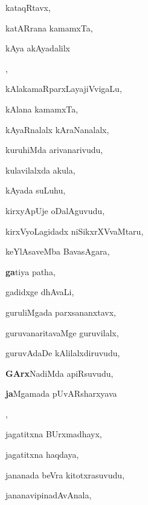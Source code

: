 \begin{multicols}{3}
{\noindent
{kataqRtavx}, \pageref{kataqRtavx}

\noindent
{katARrana kamamxTa}, \pageref{katARrana kamamxTa}

\noindent
{kAya akAyadalilx}

\noindent
{}, \pageref{kAya akAyadalilx aDaguvudu}

\noindent
{kAlakamaRparxLayajiVvigaLu}, \pageref{kAlakamaRparxLayajiVvigaLu}

\noindent
{kAlana kamamxTa}, \pageref{kAlana kamamxTa}

\noindent
{kAyaRnalalx kAraNanalalx}, \pageref{kAyaRnalalx kAraNanalalx}

\noindent
{kuruhiMda arivanarivudu}, \pageref{kuruhiMda arivanarivudu}

\noindent
{kulavilalxda akula}, \pageref{kulavilalxda akula}

\noindent
{kAyada suLuhu}, \pageref{kAyada suLuhu}

\noindent
{kirxyApUje oDalAguvudu}, \pageref{kirxyApUje oDalAguvudu}

\noindent
{kirxVyoLagidadx niSikxrXVvaMtaru}, \pageref{kirxVyoLagidadx niSikxrXVvaMtaru}

\noindent
{keYlAsaveMba BavasAgara}, \pageref{keYlAsaveMba BavasAgara}

\noindent
{{\large\textbf{ga}}tiya patha}, \pageref{gatiya patha}

\noindent
{gadidxge dhAvaLi}, \pageref{gadidxge dhAvaLi}

\noindent
{guruliMgada parxsananxtavx}, \pageref{guruliMgada parxsananxtavx}

\noindent
{guruvanaritavaMge guruvilalx}, \pageref{guruvanaritavaMge guruvilalx}

\noindent
{guruvAdaDe kAlilalxdiruvudu}, \pageref{guruvAdaDe kAlilalxdiruvudu}

\noindent
{{\large\textbf{GArx}}NadiMda apiRsuvudu}, \pageref{GArxNadiMda apiRsuvudu}

\noindent
{{\large\textbf{ja}}Mgamada pUvARsharxyava}

\noindent
{}, \pageref{jaMgamada pUvARsharxyava kaLeyuvudu}

\noindent
{jagatitxna BUrxmadhayx}, \pageref{jagatitxna BUrxmadhayx}

\noindent
{jagatitxna haqdaya}, \pageref{jagatitxna haqdaya}

\noindent
{jananada beVra kitotxrasuvudu}, \pageref{jananada beVra kitotxrasuvudu}

\noindent
{jananavipinadAvAnala}, \pageref{jananavipinadAvAnala}

}
\end{multicols}
